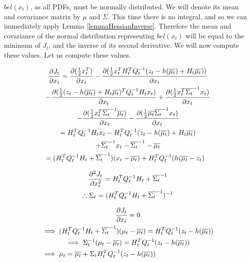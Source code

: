 \(bel(x_t)\), as all PDFs, must be normally distributed. We will denote its mean and covariance matrix by \(\mu\) and \(\Sigma\). This time there is no integral, and so we can immediately apply Lemma \ref{lemmaHessianInverse}. 
Therefore the mean and covariance of the normal distribution representing \(bel(x_t)\) will be equal to the minimum of \(J_t\), and the inverse of its second derivative. We will now compute these values. Let us compute these values.

\begin{multline*}
\frac{\partial J_t}{\partial x_t} = \frac{\partial (\frac{1}{2} x_t^T )}{\partial x_t} - \frac{\partial (\frac{1}{2} x_t^T H_t^T Q_t^{-1} (z_t - h(\overline{\mu_t}) + H_t \overline{\mu_t}))}{\partial x_t} \\
- \frac{\partial (\frac{1}{2} (z_t - h(\overline{\mu_t}) + H_t \overline{\mu_t})^T Q_t^{-1} H_t x_t)}{\partial x_t} + \frac{\partial (\frac{1}{2} x_t^T \overline{\Sigma_t}^{-1} x_t)}{\partial x_t} \\
- \frac{\partial (\frac{1}{2} x_t^T \overline{\Sigma_t}^{-1} \overline{\mu_t})}{\partial x_t} - \frac{\partial (\frac{1}{2} \overline{\mu_t} \overline{\Sigma_t}^{-1} x_t )}{\partial x_t} \\
= H_t^T Q_t^{-1} H_t x_t - H_t^T Q_t^{-1} (z_t - h(\overline{\mu_t}) + H_t \overline{\mu_t}) \\
+ \overline{\Sigma_t}^{-1} x_t - \overline{\Sigma_t}^{-1} - \overline{\mu_t} \\
= (H_t^T Q_t^{-1} H_t + \overline{\Sigma_t}^{-1}) (x_t - \overline{\mu_t}) + H_t^TQ_t^{-1}(h(\overline{\mu_t} - z_t) \hfill
\end{multline*}

\begin{multline*}
\frac{\partial^2 J_t}{\partial x_t^2} = H_t^T Q_t^{-1} H_t + \overline{\Sigma_t}^{-1} \\
\therefore \Sigma_t = (H_t^T Q_t^{-1} H_t + \overline{\Sigma_t}^{-1})^{-1} \hfill
\end{multline*}

\begin{multline*}
\frac{\partial J_t}{\partial x_t} = 0 \\
\implies (H_t^T Q_t^{-1} H_t + \overline{\Sigma_t}^{-1}) (\mu_t - \overline{\mu_t}) = H_t^TQ_t^{-1}(z_t - h(\overline{\mu_t})) \\
\implies \Sigma_t^{-1} (\mu_t - \overline{\mu_t}) = H_t^TQ_t^{-1}(z_t - h(\overline{\mu_t})) \\
\implies \mu_t = \overline{\mu_t} + \Sigma_t H_t^TQ_t^{-1}(z_t - h(\overline{\mu_t})) \hfill
\end{multline*}

